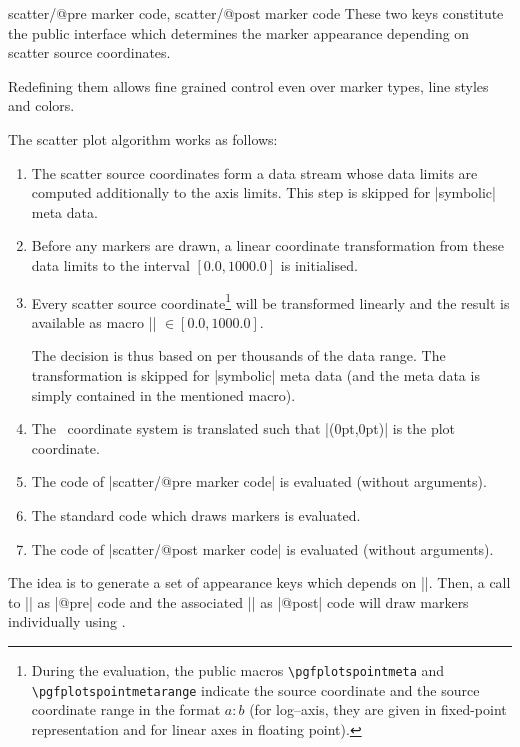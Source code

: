 {\begin{pgfplotsxycodekeylist}{
	scatter/@pre marker code,
	scatter/@post marker code}
	These two keys constitute the public interface which determines the marker appearance depending on scatter source coordinates.

	Redefining them allows fine grained control even over marker types, line styles and colors.

	The scatter plot algorithm works as follows:
\begin{enumerate} 
\item The scatter source coordinates form a data stream whose data limits are computed additionally to the axis limits. This step is skipped for |symbolic| meta data.
\item Before any markers are drawn, a linear coordinate transformation from these data limits to the interval $[0.0,1000.0]$ is initialised. 
\item Every scatter source coordinate\footnote{During the evaluation, the public macros \texttt{\textbackslash pgfplotspointmeta} and \texttt{\textbackslash pgfplotspointmetarange} indicate the source coordinate and the source coordinate range in the format $a:b$ (for log--axis, they are given in fixed-point representation and for linear axes in floating point).} will be transformed linearly and the result is available as macro |\pgfplotspointmetatransformed| $ \in [0.0,1000.0]$.

The decision is thus based on per thousands of the data range. The transformation is skipped for |symbolic| meta data (and the meta data is simply contained in the mentioned macro).
\item The \pgfname\ coordinate system is translated such that |(0pt,0pt)| is the plot coordinate.
\item The code of |scatter/@pre marker code| is evaluated (without arguments).
\item The standard code which draws markers is evaluated.
\item The code of |scatter/@post marker code| is evaluated (without arguments).
\end{enumerate}
	The idea is to generate a set of appearance keys which depends on |\pgfplotspointmetatransformed|. Then, a call to |\scope| as |@pre| code and the associated |\endscope| as |@post| code will draw markers individually using .


\end{pgfplotsxycodekeylist}}
